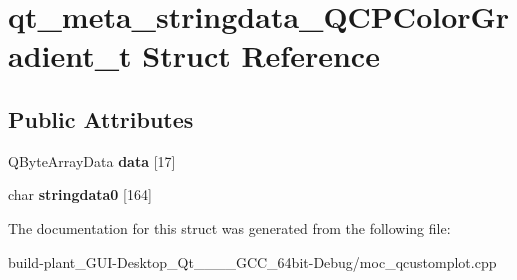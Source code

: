 \hypertarget{structqt__meta__stringdata__QCPColorGradient__t}{}\section{qt\+\_\+meta\+\_\+stringdata\+\_\+\+Q\+C\+P\+Color\+Gradient\+\_\+t Struct Reference}
\label{structqt__meta__stringdata__QCPColorGradient__t}
\subsection*{Public Attributes}
\begin{DoxyCompactItemize}
\item 
\mbox{\label{structqt__meta__stringdata__QCPColorGradient__t_a4b1142eed666e972a34a24fbcd9338e7}} 
Q\+Byte\+Array\+Data {\bfseries data} \mbox{[}17\mbox{]}
\item 
\mbox{\label{structqt__meta__stringdata__QCPColorGradient__t_af6991165899703d0e9df570ab79718c3}} 
char {\bfseries stringdata0} \mbox{[}164\mbox{]}
\end{DoxyCompactItemize}


The documentation for this struct was generated from the following file\+:\begin{DoxyCompactItemize}
\item 
build-\/plant\+\_\+\+G\+U\+I-\/\+Desktop\+\_\+\+Qt\+\_\+\_\+\_\+\_\+\+G\+C\+C\+\_\+64bit-\/\+Debug/moc\+\_\+qcustomplot.\+cpp\end{DoxyCompactItemize}
